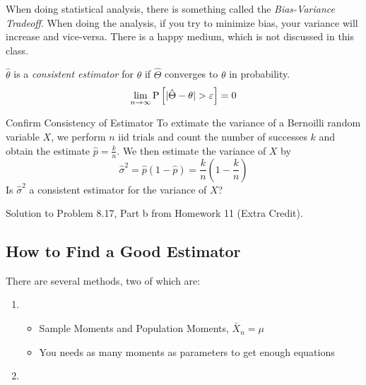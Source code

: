 \begin{remark*}
  When doing statistical analysis, there is something called the \emph{Bias-Variance Tradeoff}.
  When doing the analysis, if you try to minimize bias, your variance will increase and vice-versa.
  There is a happy medium, which is not discussed in this class.
\end{remark*}

\begin{definition}[Consistency]\label{def:Consistency}
  $\hat{\theta}$ is a \emph{consistent estimator} for $\theta$ if $\hat{\Theta}$ converges to $\theta$ in probability.
  \begin{equation}\label{eq:Consistency}
    \lim\limits_{n \to \infty} \operatorname{\operatorname{P}} \left[ \lvert \hat{\Theta} - \theta \rvert > \varepsilon \right] = 0
  \end{equation}
\end{definition}
\begin{example}[Problem 8.17]{Confirm Consistency of Estimator}
  To extimate the variance of a Bernoilli random variable $X$, we perform $n$ iid trials and count the number of successes $k$ and obtain the estimate $\hat{p} = \frac{k}{n}$.
  We then estimate the variance of $X$ by
  \begin{equation*}
    \hat{\sigma}^{2} = \hat{p} \left( 1-\hat{p} \right) = \frac{k}{n} \left( 1- \frac{k}{n} \right)
  \end{equation*}
  Is $\hat{\sigma}^{2}$ a consistent estimator for the variance of $X$?

  \tcblower

  Solution to Problem 8.17, Part b from Homework 11 (Extra Credit).
\end{example}

\subsection{How to Find a Good Estimator}\label{subsec:Find Good Estimator}
There are several methods, two of which are:
\begin{enumerate}
\item {}
  \begin{itemize}[noitemsep, nolistsep]
  \item Sample Moments and Population Moments, $\bar{X}_{n} = \mu$
  \item You needs as many moments as parameters to get enough equations
  \end{itemize}
\item {}
\end{enumerate}

